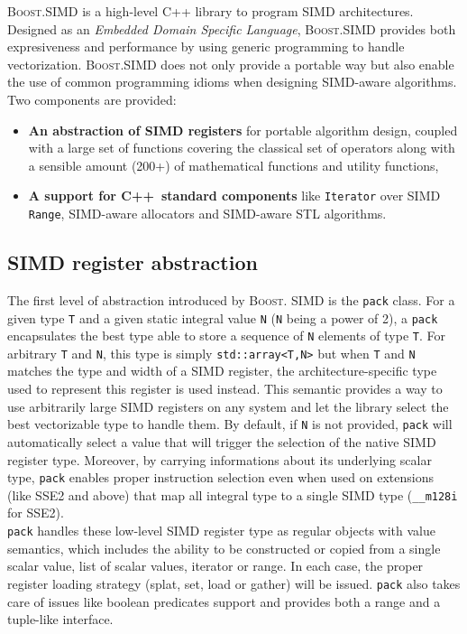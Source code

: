 \documentclass[preprint]{sigplanconf}
\providecommand{\boostsimd}{\textsc{Boost.SIMD}}
\providecommand{\cpp}[1][~]{\textsc{C++}#1}
\begin{document}
\boostsimd{} is a high-level C++ library to program SIMD architectures. 
Designed as an \textit{Embedded Domain Specific Language}, \boostsimd{} 
provides both expresiveness and performance by using generic programming 
to handle vectorization. \boostsimd{} does not only provide a portable 
way but also enable the use of common programming idioms when designing 
SIMD-aware algorithms. Two components are provided:

\begin{itemize}
\item \textbf{An abstraction of SIMD registers} for portable algorithm design,
coupled with a large set of functions covering the classical set of operators
along with a sensible amount (200+) of mathematical functions and utility functions,
\item \textbf{A support for \cpp standard components} like \texttt{Iterator}
over SIMD \texttt{Range}, SIMD-aware allocators and SIMD-aware STL algorithms.
\end{itemize}

\subsection{SIMD register abstraction}
The first level of abstraction introduced by \textsc{Boost.} \textsc{SIMD} is
the \texttt{pack} class. For a given type \texttt{T} and a given static integral 
value \texttt{N} (\texttt{N} being a power of 2), a \texttt{pack} encapsulates
the best type able to store a sequence of \texttt{N} elements of type \texttt{T}.
For arbitrary \texttt{T} and \texttt{N}, this type is simply \texttt{std::array<T,N>}
but when \texttt{T} and \texttt{N} matches the type and width of a SIMD register,
the architecture-specific type used to represent this register is used instead.
This semantic provides a way to use arbitrarily large SIMD registers on any system
and let the library select the best vectorizable type to handle them. By default,
if \texttt{N} is not provided, \texttt{pack} will automatically select a value
that will trigger the selection of the native SIMD register type. Moreover, by
carrying informations about its underlying scalar type, \texttt{pack} enables
proper instruction selection even when used on extensions (like SSE2 and above)
that map all integral type to a single SIMD type (\texttt{\_\_m128i} for SSE2).\\

\texttt{pack} handles these low-level SIMD register type as regular objects with
value semantics, which includes the ability to be constructed or copied from a
single scalar value, list of scalar values, iterator or range. In each case, the
proper register loading strategy (splat, set, load or gather) will be issued.
\texttt{pack} also takes care of issues like boolean predicates support and provides
both a range and a tuple-like interface.
\end{document}
